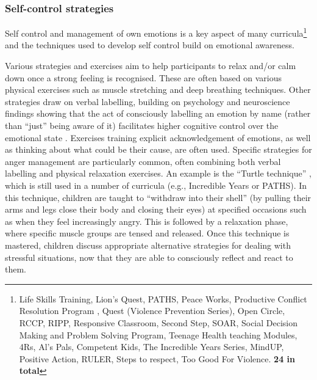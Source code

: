 \documentclass[prodmode,acmtochi]{acmsmall}
\newcommand{\todo}[1]{\textrm{\textrm{\textcolor{LightBlue}{[[#1]]}}}}
\newcommand{\todolater}[1]{}
\begin{document}
\subsubsection{Self-control strategies}
Self control and management of own emotions is a key aspect of many curricula\footnote{Life Skills Training, Lion's Quest, PATHS, Peace Works, Productive Conflict Resolution Program , Quest (Violence Prevention Series), Open Circle, RCCP, RIPP, Responsive Classroom, Second Step, SOAR, Social Decision Making and Problem Solving Program, Teenage Health teaching Modules, 4Rs, Al's Pals, Competent Kids, The Incredible Years Series, MindUP, Positive Action, RULER, Steps to respect, Too Good For Violence. {\bf 24 in total}} and the techniques used to develop self control build on emotional awareness.%

Various strategies and exercises aim to help participants to relax and/or calm down once a strong feeling is recognised. These are often based on various physical exercises such as muscle stretching and deep breathing techniques. Other strategies draw on verbal labelling, building on psychology and neuroscience findings showing that the act of consciously labelling an emotion by name (rather than ``just'' being aware of it) facilitates higher cognitive control over the emotional state \cite{Greenberg2006,Reyes2012}. Exercises training explicit acknowledgement of emotions, as well as thinking about what could be their cause, are often used. 
Specific strategies for anger management are particularly common, often combining both verbal labelling and physical relaxation exercises. An example is the ``Turtle technique'' \cite{Robin1976}, which is still used in a number of curricula (e.g., Incredible Years or PATHS). In this technique, children are taught to ``withdraw into their shell'' (by pulling their arms and legs close their body and closing their eyes) at specified occasions such as when they feel increasingly angry. This is followed by a relaxation phase, where specific muscle groups are tensed and released. Once this technique is mastered, children discuss appropriate alternative strategies for dealing with stressful situations, now that they are able to consciously reflect and react to them. 
\todolater{For older children, self-control exercises focus on supporting personal management more broadly, such as promoting goal setting, self-motivation and grit.}
\end{document}

